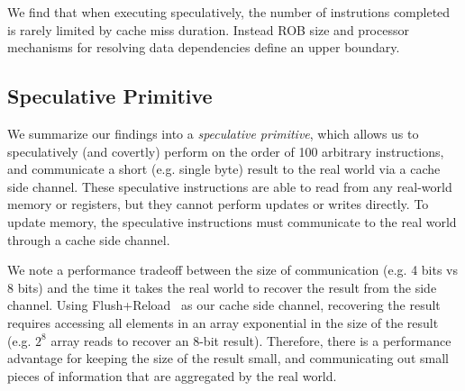 \medskip

We find that when executing speculatively, the number of instrutions completed
is rarely limited by cache miss duration. Instead
ROB size and processor mechanisms for resolving
data dependencies define an upper boundary.



\FigCacheMiss

\subsection{Speculative Primitive}

We summarize our findings into a \emph{speculative primitive}, which allows us to
speculatively (and covertly) perform on the order of 100 arbitrary
instructions, and communicate a short (e.g. single byte) result to the real
world via a cache side channel. These speculative instructions are able to read
from any real-world memory or registers, but they cannot perform updates or
writes directly. To update memory, the speculative instructions must communicate
to the real world through a cache side channel.

We note a performance tradeoff between the size of communication (e.g. 4 bits vs 8
bits) and the time it takes the real world to recover the result from the side
channel. Using Flush+Reload~\cite{yarom2014flush+} as our cache side channel,
recovering the result requires accessing all elements in an array exponential in
the size of the result (e.g. $2^8$ array reads to recover an 8-bit result). 
Therefore, there is a
performance advantage for keeping the size of the result small, and communicating
out small pieces of information that are aggregated by the real world.


